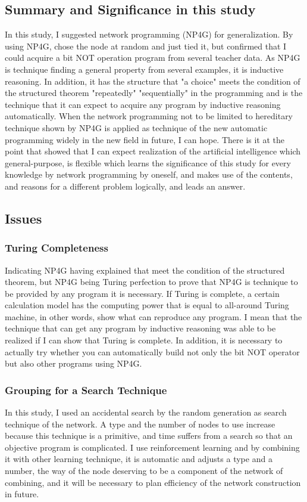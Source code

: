\documentclass{article}
\begin{document}
\subsection {Summary and Significance in this study}
In this study, I suggested network programming (NP4G) for generalization.
By using NP4G, chose the node at random and just tied it, but confirmed that I could acquire a bit NOT operation program from several teacher data.
As NP4G is technique finding a general property from several examples, it is inductive reasoning.
In addition, it has the structure that "a choice" meets the condition of the structured theorem "repeatedly" "sequentially" in the programming and is the technique that it can expect to acquire any program by inductive reasoning automatically.
When the network programming not to be limited to hereditary technique shown by NP4G is applied as technique of the new automatic programming widely in the new field in future, I can hope.
There is it at the point that showed that I can expect realization of the artificial intelligence which general-purpose, is flexible which learns the significance of this study for every knowledge by network programming by oneself, and makes use of the contents, and reasons for a different problem logically, and leads an answer.
\subsection {Issues}
\subsubsection {Turing Completeness}
Indicating NP4G having explained that meet the condition of the structured theorem, but NP4G being Turing perfection to prove that NP4G is technique to be provided by any program it is necessary.
If Turing is complete, a certain calculation model has the computing power that is equal to all-around Turing machine, in other words, show what can reproduce any program.
I mean that the technique that can get any program by inductive reasoning was able to be realized if I can show that Turing is complete.
In addition, it is necessary to actually try whether you can automatically build not only the bit NOT operator but also other programs using NP4G.
\subsubsection {Grouping for a Search Technique}
In this study, I used an accidental search by the random generation as search technique of the network.
A type and the number of nodes to use increase because this technique is a primitive, and time suffers from a search so that an objective program is complicated.
I use reinforcement learning and by combining it with other learning technique, it is automatic and adjusts a type and a number, the way of the node deserving to be a component of the network of combining, and it will be necessary to plan efficiency of the network construction in future.
\end{document}
